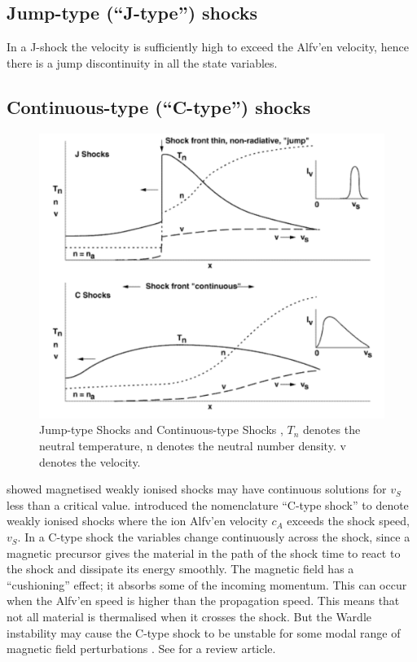 \subsection{Jump-type (``J-type'') shocks}
In a J-shock the velocity is sufficiently high to exceed the Alfv\a'{e}n velocity, hence there is a jump discontinuity in all the state variables.

\subsection{Continuous-type (``C-type'') shocks}

\begin{figure}[t]
\centering
\includegraphics[width=\textwidth]{CJShock}
\caption{
Jump-type Shocks and Continuous-type Shocks 
, $T_n$ denotes the neutral temperature, n denotes the neutral number density. v denotes the velocity.
}
\label{fig:CJShock} %
\end{figure}

\citet{1971MNRAS.153..145M} showed magnetised weakly ionised shocks may have continuous solutions for $v_S$ less than a critical value.
\citet{1980ApJ...241.1021D} introduced the nomenclature ``C-type shock'' to denote weakly ionised shocks where the ion Alfv\a'{e}n velocity $c_A$ exceeds the shock speed, $v_S$. 
In a C-type shock the variables change continuously across the shock, since a magnetic precursor gives the material in the path of the shock time to react to the shock and dissipate its energy smoothly.
The magnetic field has a ``cushioning'' effect; it absorbs some of the incoming momentum.
This can occur when the Alfv\a'{e}n speed is higher than the propagation speed.
This means that not all material is thermalised when it crosses the shock.
But the Wardle instability may cause the C-type shock to be unstable 
for some modal range of magnetic field perturbations
\citep{1997ApJ...487..271S}. 
See \citet{1993ARA&A..31..373D} for a review article.

